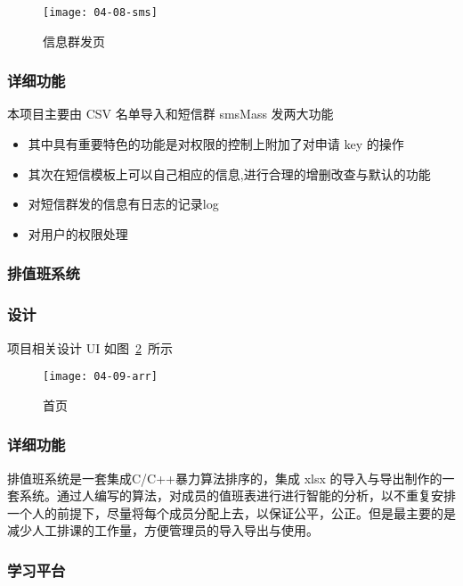 \begin{figure}[htbp]
\centering
\texttt{[image: 04-08-sms]}
\caption{信息群发页}
\label{fig:04-08-sms}
\end{figure}

\subsubsection*{详细功能}

本项目主要由 CSV 名单导入和短信群 smsMass 发两大功能
\begin{itemize}
  \item 其中具有重要特色的功能是对权限的控制上附加了对申请 key 的操作
  \item 其次在短信模板上可以自己相应的信息,进行合理的增删改查与默认的功能
  \item 对短信群发的信息有日志的记录log
  \item 对用户的权限处理
\end{itemize}

\subsubsection{排值班系统}
\label{sec:requirements}

\subsubsection*{设计}

项目相关设计 UI 如图~\ref{fig:04-09-arr}~所示

\begin{figure}[htbp]
\centering
\texttt{[image: 04-09-arr]}
\caption{首页}
\label{fig:04-09-arr}
\end{figure}

\subsubsection*{详细功能}

排值班系统是一套集成C/C++暴力算法排序的，集成 xlsx 的导入与导出制作的一套系统。通过人编写的算法，对成员的值班表进行进行智能的分析，以不重复安排一个人的前提下，尽量将每个成员分配上去，以保证公平，公正。但是最主要的是减少人工排课的工作量，方便管理员的导入导出与使用。

\subsubsection{学习平台}
\label{sec:requirements}

